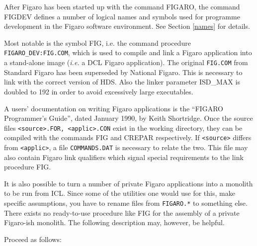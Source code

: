 After Figaro has been started up with the command FIGARO, the command FIGDEV
defines a number of logical names and symbols used for programme development in
the Figaro software environment. See Section \ref{names} for details.

Most notable is the symbol FIG, i.e. the command procedure {\tt
FIGARO\_DEV:FIG.COM}, which is used to compile and link a Figaro application
into a stand-alone image ({\em i.e.\/} a DCL Figaro application). The original
{\tt FIG.COM} from Standard Figaro has been superseded by National Figaro. This
is necessary to link with the correct version of HDS. Also the linker parameter
ISD\_MAX is doubled to 192 in order to avoid excessively large executables.

A users' documentation on writing Figaro applications is the ``FIGARO
Programmer's Guide'', dated January 1990, by Keith Shortridge. Once the source
files {\tt <source>.FOR, <applic>.CON} exist in the working directory, they can
be compiled with the commands FIG and CREPAR respectively. If {\tt <source>}
differs from {\tt <applic>}, a file {\tt COMMANDS.DAT} is necessary to relate
the two. This file may also contain Figaro link qualifiers which signal special
requirements to the link procedure FIG.

It is also possible to turn a number of private Figaro applications into a
monolith to be run from ICL. Since some of the utilities one would use for
this, make specific assumptions, you have to rename files from {\tt FIGARO.*}
to something else. There exists no ready-to-use procedure like FIG for the
assembly of a private Figaro-ish monolith. The following description may,
however, be helpful.

Proceed as follows:

